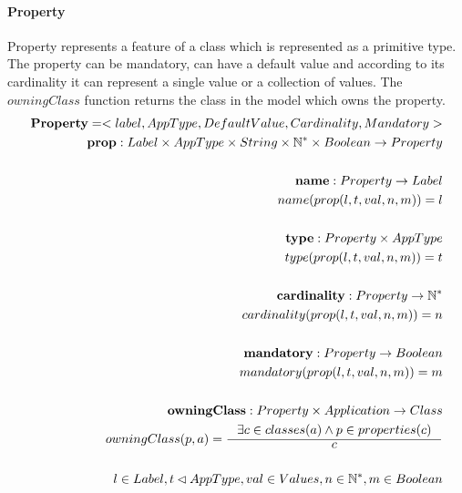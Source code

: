 \documentclass[11pt]{article}
\begin{document}
\paragraph{Property} Property represents a feature of a class which is represented as a primitive type. The property can be mandatory, can have a default value and according to its cardinality it can represent a single value or a collection of values. The $owningClass$ function returns the class in the model which owns the property.
\begin{align*}
	\mathbf{Property} = <label, AppType, DefaultValue, Cardinality, Mandatory> \\
	\mathbf{prop} : Label \times AppType \times String \times \mathbb{N^{*}} \times Boolean \rightarrow Property \\ \\
	\mathbf{name} : Property \rightarrow Label \\
	name(prop(l, t, val, n, m)) = l \\ \\
	\mathbf{type} : Property \times AppType \\
	type(prop(l, t, val, n, m)) = t \\ \\
	\mathbf{cardinality} : Property \rightarrow \mathbb{N^{*}} \\
	cardinality(prop(l, t, val, n, m)) = n \\ \\
	\mathbf{mandatory} : Property \rightarrow Boolean \\
	mandatory(prop(l, t, val, n, m)) = m  \\ \\
	\mathbf{owningClass} : Property \times Application \rightarrow Class  \\ 	
	owningClass(p, a) = \inference{\exists c \in classes(a) \wedge p \in properties(c)}{c}  \\ \\
	l \in Label, t \lhd AppType, val \in Values, n \in \mathbb{N^{*}}, m \in Boolean 
\end{align*}
\end{document}
